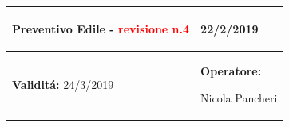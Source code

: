 \documentclass[a4paper]{article}
\begin{document}
                                  \begin{center}
                                  \begin{tabular}{|L{89mm} R{60mm}| }
                                  \hline
                                  \vspace{2.5mm}
                                  \begin{spacing}{0}
                                \textbf{Preventivo Edile - } \textcolor{red}{revisione n.4}
                                  \end{spacing}&
                                  \vspace{2.5mm}
                                  \begin{spacing}{0}

                                22/2/2019

                                  \end{spacing}\\
                                  \hline
                                  \vspace{2.5mm}
                                  \begin{spacing}{0}

                                
                                        \textbf{Validit\'a:}
                                   24/3/2019
                                  \end{spacing} &
                                  \vspace{2.5mm}
                                  \begin{spacing}{0}
                                    \textbf{Operatore:}

                               Nicola Pancheri
                                  \end{spacing} \\
                                  \hline
                                  \end{tabular}
                                  \end{center}
                               
\end{document}
